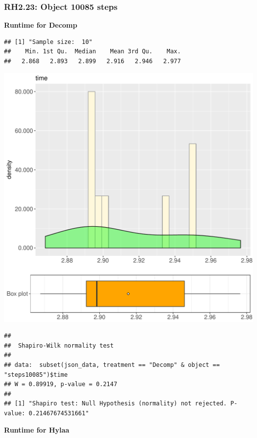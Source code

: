 \documentclass{article}\usepackage[]{graphicx}\usepackage[]{color}
\makeatletter
\def\maxwidth{ %
  \ifdim\Gin@nat@width>\linewidth
    \linewidth
  \else
    \Gin@nat@width
  \fi
}
\newenvironment{kframe}{%
 \def\at@end@of@kframe{}%
 \ifinner\ifhmode%
  \def\at@end@of@kframe{\end{minipage}}%
  \begin{minipage}{\columnwidth}%
 \fi\fi%
 \def\FrameCommand##1{\hskip\@totalleftmargin \hskip-\fboxsep
 \colorbox{shadecolor}{##1}\hskip-\fboxsep
     \hskip-\linewidth \hskip-\@totalleftmargin \hskip\columnwidth}%
 \MakeFramed {\advance\hsize-\width
   \@totalleftmargin\z@ \linewidth\hsize
   \@setminipage}}%
 {\par\unskip\endMakeFramed%
 \at@end@of@kframe}
\newenvironment{knitrout}{}{} %
\makeatother
\begin{document}
\subsubsection{RH2.23: Object 10085 steps}

 \textbf{Runtime for Decomp}
\begin{knitrout}
\color{fgcolor}\begin{kframe}
\begin{verbatim}
## [1] "Sample size:  10"
##    Min. 1st Qu.  Median    Mean 3rd Qu.    Max. 
##   2.868   2.893   2.899   2.916   2.946   2.977
\end{verbatim}
\end{kframe}
\includegraphics[width=\maxwidth]{figure/RH2_Decomp_steps10085-1} 
\begin{kframe}\begin{verbatim}
## 
## 	Shapiro-Wilk normality test
## 
## data:  subset(json_data, treatment == "Decomp" & object == "steps10085")$time
## W = 0.89919, p-value = 0.2147
## 
## [1] "Shapiro test: Null Hypothesis (normality) not rejected. P-value: 0.21467674531661"
\end{verbatim}
\end{kframe}
\end{knitrout}
 \textbf{Runtime for Hylaa}
\end{document}
